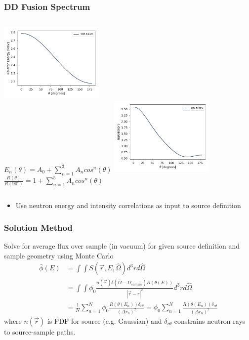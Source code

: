 \documentclass[12pt,xcolor=dvipsnames]{beamer}
\begin{document}
\begin{frame}
\frametitle{DD Fusion Spectrum}
\begin{columns}[c]
\column{2in}
\includegraphics[width=2in]{energy_angle.png}\\
$E_n(\theta) = A_0 + \sum_{n=1}^3 A_n cos^n(\theta)$
\column{2in}
\includegraphics[width=2in]{intensity_angle.png}\\
$\frac{R(\theta)}{R(90^{\circ})}=1+\sum_{n=1}^5 A_n cos^n(\theta)$
\end{columns}
\begin{itemize}
\item Use neutron energy and intensity correlations as input to source definition
\end{itemize}
\end{frame}

\begin{frame}
\frametitle{Solution Method}
Solve for average flux over sample (in vacuum) for given source definition and sample geometry using Monte Carlo
\begin{align*}
\bar{\phi}(E) &= \int \int S(\vec{r},E,\hat{\Omega})d^3rd\hat{\Omega} \\
              &= \int \int \phi_0 \frac{n(\vec{r})\delta (\hat{\Omega}-\Omega_{sample})R(\theta(E))}{|\vec{r}-r|^2} d^3rd\hat{\Omega} \\
              &= \frac{1}{N} \sum_{n=1}^{N} \phi_0 \frac{R(\theta(E_n))\delta_{r\theta}}{(\Delta r_n)^2} = \phi_0 \sum_{n=1}^{N} \frac{R(\theta(E_n))\delta_{r\theta}}{(\Delta r_n)^2}
\end{align*}
where $n(\vec{r})$ is PDF for source (e.g. Gaussian) and $\delta_{r\theta}$ constrains neutron rays to source-sample paths. 
\end{frame}
\end{document}
